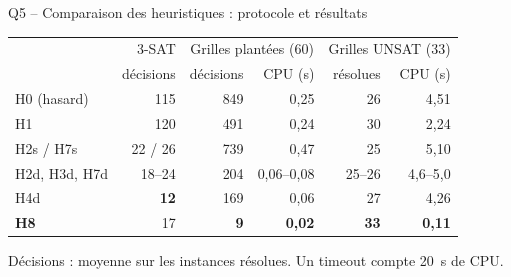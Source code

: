 \documentclass[aspectratio=169,11pt]{beamer}
\begin{document}
\begin{frame}{Q5 -- Comparaison des heuristiques : protocole et résultats}
  \medskip

  \begin{center}\small
  \begin{tabular}{@{}l r | r r | r r@{}}
    \toprule
     & 3-SAT & \multicolumn{2}{c|}{Grilles plantées (60)} & \multicolumn{2}{c}{Grilles UNSAT (33)} \\
     & décisions & décisions & CPU (s) & résolues & CPU (s) \\
    \midrule
    H0 (hasard) & 115 & 849 & 0,25 & 26 & 4,51 \\
    H1          & 120 & 491 & 0,24 & 30 & 2,24 \\
    H2s / H7s   & 22 / 26 & 739 & 0,47 & 25 & 5,10 \\
    H2d, H3d, H7d & 18--24 & 204 & 0,06--0,08 & 25--26 & 4,6--5,0 \\
    H4d         & \textbf{12} & 169 & 0,06 & 27 & 4,26 \\
    \rowcolor{green!10} \textbf{H8} & 17 & \textbf{9} & \textbf{0,02} & \textbf{33} & \textbf{0,11} \\
    \bottomrule
  \end{tabular}
  \end{center}
  {\footnotesize Décisions : moyenne sur les instances résolues. Un timeout compte 20~s de CPU.\par}
\end{frame}
\end{document}
